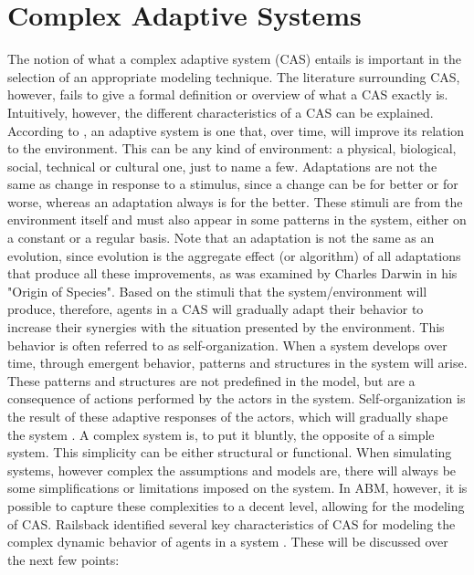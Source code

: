 \section{Complex Adaptive Systems} \label{CAS}
The notion of what a complex adaptive system (CAS) entails is important in the selection of an appropriate modeling technique. The literature surrounding CAS, however, fails to give a formal definition or overview of what a CAS exactly is. Intuitively, however, the different characteristics of a CAS can be explained. According to \cite{ABM}, an adaptive system is one that, over time, will improve its relation to the environment. This can be any kind of environment: a physical, biological, social, technical or cultural one, just to name a few. Adaptations are not the same as change in response to a stimulus, since a change can be for better or for worse, whereas an adaptation always is for the better. These stimuli are from the environment itself and must also appear in some patterns in the system, either on a constant or a regular basis. Note that an adaptation is not the same as an evolution, since evolution is the aggregate effect (or algorithm) of all adaptations that produce all these improvements, as was examined by Charles Darwin in his "Origin of Species"\cite{Darwin}. Based on the stimuli that the system/environment will produce, therefore, agents in a CAS will gradually adapt their behavior to increase their synergies with the situation presented by the environment. This behavior is often referred to as self-organization. When a system develops over time, through emergent behavior, patterns and structures in the system will arise. These patterns and structures are not predefined in the model, but are a consequence of actions performed by the actors in the system. Self-organization is the result of these adaptive responses of the actors, which will gradually shape the system \cite{ABM}. 
\newline \newline \noindent
A complex system is, to put it bluntly, the opposite of a simple system. This simplicity can be either structural or functional. When simulating systems, however complex the assumptions and models are, there will always be some simplifications or limitations imposed on the system. In ABM, however, it is possible to capture these complexities to a decent level, allowing for the modeling of CAS. 
\newline \newline \noindent
Railsback identified several key characteristics of CAS for modeling the complex dynamic behavior of agents in a system \cite{6CAS}. These will be discussed over the next few points:
